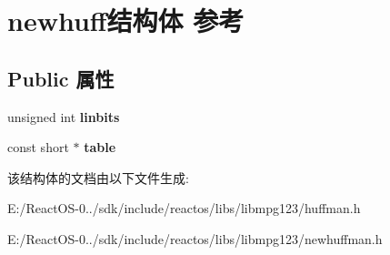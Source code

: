 \hypertarget{structnewhuff}{}\section{newhuff结构体 参考}
\label{structnewhuff}
\subsection*{Public 属性}
\begin{DoxyCompactItemize}
\item 
\mbox{\label{structnewhuff_a6e4f084279574952952eeaff61c292ab}} 
unsigned int {\bfseries linbits}
\item 
\mbox{\label{structnewhuff_a8c61d263192f217e3af1eff6ff9ea00f}} 
const short $\ast$ {\bfseries table}
\end{DoxyCompactItemize}


该结构体的文档由以下文件生成\+:\begin{DoxyCompactItemize}
\item 
E\+:/\+React\+O\+S-\/0../sdk/include/reactos/libs/libmpg123/huffman.\+h\item 
E\+:/\+React\+O\+S-\/0../sdk/include/reactos/libs/libmpg123/newhuffman.\+h\end{DoxyCompactItemize}
